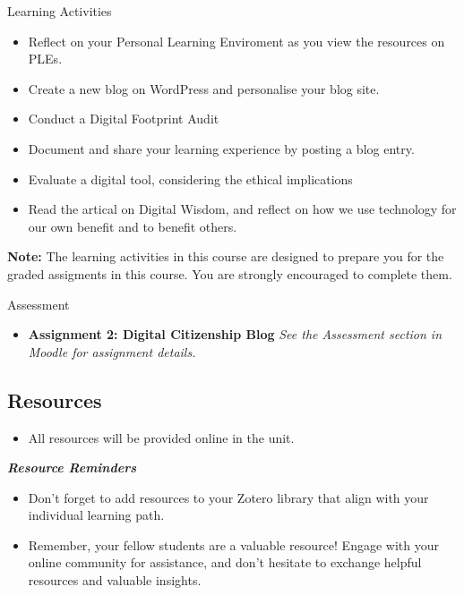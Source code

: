 \documentclass[
]{book}
\providecommand{\tightlist}{%
  \setlength{\itemsep}{0pt}\setlength{\parskip}{0pt}}
\theoremstyle{definition}
\theoremstyle{definition}
\theoremstyle{definition}
\theoremstyle{definition}
\theoremstyle{remark}
\begin{document}
\begin{reflect}
{Learning Activities}

\begin{itemize}
\tightlist
\item
  Reflect on your Personal Learning Enviroment as you view the resources on PLEs.\\
\item
  Create a new blog on WordPress and personalise your blog site.\\
\item
  Conduct a Digital Footprint Audit\\
\item
  Document and share your learning experience by posting a blog entry.\\
\item
  Evaluate a digital tool, considering the ethical implications\\
\item
  Read the artical on Digital Wisdom, and reflect on how we use technology for our own benefit and to benefit others.
\end{itemize}

\textbf{Note:} The learning activities in this course are designed to prepare you for the graded assigments in this course. You are strongly encouraged to complete them.
\end{reflect}

\begin{assessment}
{Assessment}

\begin{itemize}
\tightlist
\item
  \textbf{Assignment 2: Digital Citizenship Blog}
  \emph{See the Assessment section in Moodle for assignment details.}
\end{itemize}
\end{assessment}

\hypertarget{resources-3}{%
\subsection*{Resources}\label{resources-3}}

\begin{itemize}
\tightlist
\item
  All resources will be provided online in the unit.
\end{itemize}

\begin{feedback}
\textbf{\emph{Resource Reminders}}

\begin{itemize}
\tightlist
\item
  Don't forget to add resources to your Zotero library that align with
  your individual learning path.\\
\item
  Remember, your fellow students are a valuable resource! Engage with
  your online community for assistance, and don't hesitate to exchange
  helpful resources and valuable insights.
\end{itemize}
\end{feedback}
\end{document}
